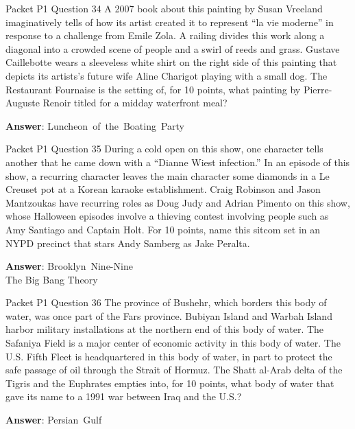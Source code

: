 \begin{frame}{Packet P1 Question 34}
A 2007 book about this painting by Susan Vreeland imaginatively tells of how its artist created it to represent ``la vie moderne'' in response to a challenge from Emile Zola. A railing divides this work along   a diagonal into a crowded scene of people and a swirl of reeds and grass. Gustave Caillebotte wears   a sleeveless white shirt on the right side of this painting that depicts its artists's future wife Aline Charigot playing   with a small dog. The Restaurant Fournaise is the setting of, for 10 points, what painting by Pierre-Auguste Renoir titled for a midday   waterfront meal?

\textbf{Answer}: Luncheon\ of\ the\ Boating\ Party\\
\end{frame}

\begin{frame}{Packet P1 Question 35}
During a cold open on this show, one character tells another that   he came down with a ``Dianne Wiest infection.'' In an episode of this show, a recurring character leaves the main character some diamonds in a Le Creuset pot at a Korean karaoke establishment. Craig Robinson and Jason Mantzoukas have recurring roles as Doug Judy and Adrian Pimento on this show, whose Halloween episodes involve a thieving contest involving people such as Amy Santiago and Captain Holt. For 10 points,   name this sitcom set in an NYPD precinct that stars Andy Samberg     as Jake Peralta.  

\textbf{Answer}: Brooklyn\ Nine-Nine\\
 The Big Bang Theory
\end{frame}

\begin{frame}{Packet P1 Question 36}
The province of Bushehr, which borders this body of water, was once part of the Fars province. Bubiyan Island and Warbah Island harbor military installations at the northern end of this body of water. The Safaniya Field is a major center of economic activity in this body of water. The U.S. Fifth Fleet is headquartered in this body of water, in part to protect the safe passage of oil through the Strait of Hormuz. The Shatt   al-Arab delta of   the Tigris and the   Euphrates empties into, for 10 points, what body of water that gave its name to a 1991 war between Iraq   and the U.S.?

\textbf{Answer}: Persian\ Gulf\\
\end{frame}

